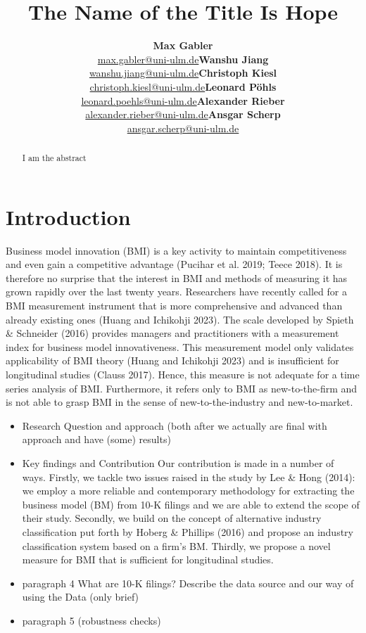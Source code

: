\documentclass[
]{article}
\title{The Name of the Title Is Hope}
\author{\textbf{Max
Gabler}\\\href{mailto:max.gabler@uni-ulm.de}{max.gabler@uni-ulm.de}\asep\textbf{Wanshu
Jiang}\\\href{mailto:wanshu.jiang@uni-ulm.de}{wanshu.jiang@uni-ulm.de}\asep\textbf{Christoph
Kiesl}\\\href{mailto:christoph.kiesl@uni-ulm.de}{christoph.kiesl@uni-ulm.de}\asep\textbf{Leonard
Pöhls}\\\href{mailto:leonard.poehls@uni-ulm.de}{leonard.poehls@uni-ulm.de}\asep\textbf{Alexander
Rieber}\\\href{mailto:alexander.rieber@uni-ulm.de}{alexander.rieber@uni-ulm.de}\asep\textbf{Ansgar
Scherp}\\\href{mailto:ansgar.scherp@uni-ulm.de}{ansgar.scherp@uni-ulm.de}}
\date{}
\renewcommand*\contentsname{Table of contents}
\newcommand\contentsname{Table of contents}
\begin{document}
\maketitle
\begin{abstract}
I am the abstract
\end{abstract}

\renewcommand*\contentsname{Table of contents}
{
\hypersetup{linkcolor=}
\setcounter{tocdepth}{3}
\tableofcontents
}
\section{Introduction}\label{introduction}

Business model innovation (BMI) is a key activity to maintain
competitiveness and even gain a competitive advantage (Pucihar et al.
2019; Teece 2018). It is therefore no surprise that the interest in BMI
and methods of measuring it has grown rapidly over the last twenty
years. Researchers have recently called for a BMI measurement instrument
that is more comprehensive and advanced than already existing ones
(Huang and Ichikohji 2023). The scale developed by Spieth \& Schneider
(2016) provides managers and practitioners with a measurement index for
business model innovativeness. This measurement model only validates
applicability of BMI theory (Huang and Ichikohji 2023) and is
insufficient for longitudinal studies (Clauss 2017). Hence, this measure
is not adequate for a time series analysis of BMI. Furthermore, it
refers only to BMI as new-to-the-firm and is not able to grasp BMI in
the sense of new-to-the-industry and new-to-market.

\begin{itemize}
\item
  Research Question and approach (both after we actually are final with
  approach and have (some) results)
\item
  Key findings and Contribution Our contribution is made in a number of
  ways. Firstly, we tackle two issues raised in the study by Lee \& Hong
  (2014): we employ a more reliable and contemporary methodology for
  extracting the business model (BM) from 10-K filings and we are able
  to extend the scope of their study. Secondly, we build on the concept
  of alternative industry classification put forth by Hoberg \& Phillips
  (2016) and propose an industry classification system based on a firm's
  BM. Thirdly, we propose a novel measure for BMI that is sufficient for
  longitudinal studies.
\item
  paragraph 4 What are 10-K filings? Describe the data source and our
  way of using the Data (only brief)
\item
  paragraph 5 (robustness checks)
\end{itemize}
\end{document}
